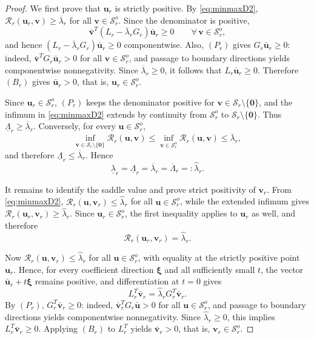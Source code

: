 \documentclass[10pt,a4paper]{amsart}
\begin{document}
\begin{proof}
	We first prove that $\mathbf{u}_r$ is strictly positive. By
	\eqref{eq:minmaxD2},
	$\mathcal{R}_r(\mathbf{u}_r,\mathbf{v})\ge\overline\lambda_r$
	for all $\mathbf{v}\in\mathcal{S}_r^o$. Since the denominator is positive,
	\[
	\bar{\mathbf v}^{T}(L_r-\overline\lambda_r G_r)\bar{\mathbf u}_r\ge0
	\qquad \forall\,\mathbf v\in\mathcal S_r^o,
	\]
	and hence $(L_r-\overline\lambda_r G_r)\bar{\mathbf{u}}_r\ge0$ componentwise.
	Also, $(P_r)$ gives $G_r\bar{\mathbf{u}}_r\ge0$: indeed,
	$\bar{\mathbf v}^{T}G_r\bar{\mathbf u}_r>0$ for all
	$\mathbf v\in\mathcal S_r^o$, and passage to boundary directions yields
	componentwise nonnegativity. Since $\overline\lambda_r\ge0$, it follows that
	$L_r\bar{\mathbf{u}}_r\ge0$. Therefore $(B_r)$ gives
	$\bar{\mathbf{u}}_r>0$, that is, $\mathbf{u}_r\in\mathcal{S}_r^o$.
	
	Since $\mathbf{u}_r\in\mathcal{S}_r^o$, $(P_r)$ keeps the denominator positive
	for $\mathbf v\in\mathcal S_r\setminus\{\mathbf0\}$, and the infimum in
	\eqref{eq:minmaxD2} extends by continuity from $\mathcal{S}_r^o$ to
	$\mathcal{S}_r\setminus\{\mathbf{0}\}$. Thus
	$\underline\Lambda_r\ge\overline\lambda_r$. Conversely, for every
	$\mathbf u\in\mathcal{S}_r^o$,
	\[
	\inf_{\mathbf v\in\mathcal{S}_r\setminus\{\mathbf0\}}
	\mathcal R_r(\mathbf u,\mathbf v)
	\le
	\inf_{\mathbf v\in\mathcal{S}_r^o}
	\mathcal R_r(\mathbf u,\mathbf v)
	\le
	\overline\lambda_r,
	\]
	and therefore $\underline\Lambda_r\le\overline\lambda_r$. Hence
	\[
	\underline\lambda_r=\underline\Lambda_r=\overline\lambda_r=\overline\Lambda_r=:\hat\lambda_r.
	\]
	
	It remains to identify the saddle value and prove strict positivity of
	$\mathbf{v}_r$. From \eqref{eq:minmaxD2},
	$\mathcal{R}_r(\mathbf{u},\mathbf{v}_r)\le\hat\lambda_r$ for all
	$\mathbf{u}\in\mathcal{S}_r^o$, while the extended infimum gives
	$\mathcal{R}_r(\mathbf{u}_r,\mathbf{v}_r)\ge\hat\lambda_r$. Since
	$\mathbf{u}_r\in\mathcal{S}_r^o$, the first inequality applies to
	$\mathbf{u}_r$ as well, and therefore
	\[
	\mathcal{R}_r(\mathbf{u}_r,\mathbf{v}_r)=\hat\lambda_r.
	\]
	
	Now $\mathcal{R}_r(\mathbf{u},\mathbf{v}_r)\le\hat\lambda_r$ for all
	$\mathbf u\in\mathcal S_r^o$, with equality at the strictly positive point
	$\mathbf u_r$. Hence, for every coefficient direction $\boldsymbol\xi$ and
	all sufficiently small \(t\), the vector
	\(\bar{\mathbf u}_r+t\boldsymbol\xi\) remains positive, and differentiation
	at \(t=0\) gives
	\[
	L_r^T\bar{\mathbf{v}}_r=\hat\lambda_r G_r^T\bar{\mathbf{v}}_r.
	\]
	By $(P_r)$, $G_r^T\bar{\mathbf{v}}_r\ge0$: indeed,
	$\bar{\mathbf v}_r^T G_r\bar{\mathbf u}>0$ for all
	$\mathbf u\in\mathcal S_r^o$, and passage to boundary directions yields
	componentwise nonnegativity. Since $\hat\lambda_r\ge0$, this implies
	$L_r^T\bar{\mathbf{v}}_r\ge0$. Applying $(B_r)$ to $L_r^T$ yields
	$\bar{\mathbf{v}}_r>0$, that is, $\mathbf{v}_r\in\mathcal{S}_r^o$.
	

\end{proof}
\end{document}

